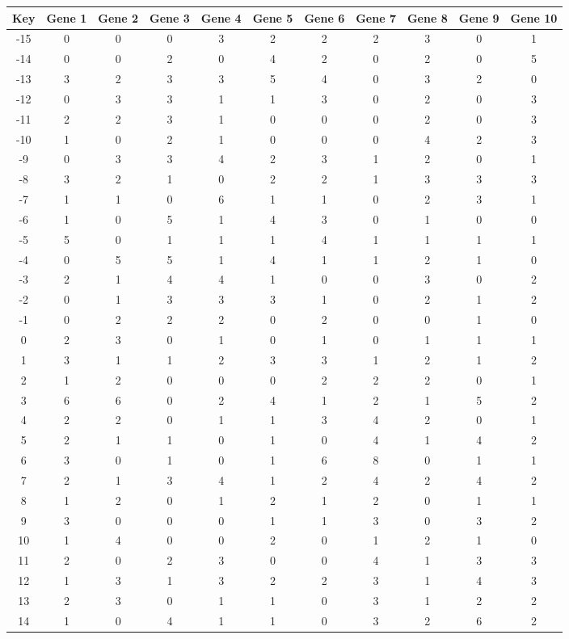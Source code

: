 \begin{tabular}{|c|c|c|c|c|c|c|c|c|c|c|}
\hline
Key & Gene 1 & Gene 2 & Gene 3 & Gene 4 & Gene 5 & Gene 6 & Gene 7 & Gene 8 & Gene 9 & Gene 10 \\
\hline
-15 & 0 & 0 & 0 & 3 & 2 & 2 & 2 & 3 & 0 & 1 \\
-14 & 0 & 0 & 2 & 0 & 4 & 2 & 0 & 2 & 0 & 5 \\
-13 & 3 & 2 & 3 & 3 & 5 & 4 & 0 & 3 & 2 & 0 \\
-12 & 0 & 3 & 3 & 1 & 1 & 3 & 0 & 2 & 0 & 3 \\
-11 & 2 & 2 & 3 & 1 & 0 & 0 & 0 & 2 & 0 & 3 \\
-10 & 1 & 0 & 2 & 1 & 0 & 0 & 0 & 4 & 2 & 3 \\
-9 & 0 & 3 & 3 & 4 & 2 & 3 & 1 & 2 & 0 & 1 \\
-8 & 3 & 2 & 1 & 0 & 2 & 2 & 1 & 3 & 3 & 3 \\
-7 & 1 & 1 & 0 & 6 & 1 & 1 & 0 & 2 & 3 & 1 \\
-6 & 1 & 0 & 5 & 1 & 4 & 3 & 0 & 1 & 0 & 0 \\
-5 & 5 & 0 & 1 & 1 & 1 & 4 & 1 & 1 & 1 & 1 \\
-4 & 0 & 5 & 5 & 1 & 4 & 1 & 1 & 2 & 1 & 0 \\
-3 & 2 & 1 & 4 & 4 & 1 & 0 & 0 & 3 & 0 & 2 \\
-2 & 0 & 1 & 3 & 3 & 3 & 1 & 0 & 2 & 1 & 2 \\
-1 & 0 & 2 & 2 & 2 & 0 & 2 & 0 & 0 & 1 & 0 \\
0 & 2 & 3 & 0 & 1 & 0 & 1 & 0 & 1 & 1 & 1 \\
1 & 3 & 1 & 1 & 2 & 3 & 3 & 1 & 2 & 1 & 2 \\
2 & 1 & 2 & 0 & 0 & 0 & 2 & 2 & 2 & 0 & 1 \\
3 & 6 & 6 & 0 & 2 & 4 & 1 & 2 & 1 & 5 & 2 \\
4 & 2 & 2 & 0 & 1 & 1 & 3 & 4 & 2 & 0 & 1 \\
5 & 2 & 1 & 1 & 0 & 1 & 0 & 4 & 1 & 4 & 2 \\
6 & 3 & 0 & 1 & 0 & 1 & 6 & 8 & 0 & 1 & 1 \\
7 & 2 & 1 & 3 & 4 & 1 & 2 & 4 & 2 & 4 & 2 \\
8 & 1 & 2 & 0 & 1 & 2 & 1 & 2 & 0 & 1 & 1 \\
9 & 3 & 0 & 0 & 0 & 1 & 1 & 3 & 0 & 3 & 2 \\
10 & 1 & 4 & 0 & 0 & 2 & 0 & 1 & 2 & 1 & 0 \\
11 & 2 & 0 & 2 & 3 & 0 & 0 & 4 & 1 & 3 & 3 \\
12 & 1 & 3 & 1 & 3 & 2 & 2 & 3 & 1 & 4 & 3 \\
13 & 2 & 3 & 0 & 1 & 1 & 0 & 3 & 1 & 2 & 2 \\
14 & 1 & 0 & 4 & 1 & 1 & 0 & 3 & 2 & 6 & 2 \\
\hline
\end{tabular}